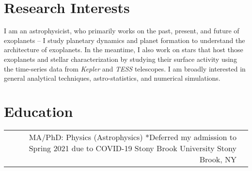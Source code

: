 \documentclass[10pt]{article} %
\begin{document}
\begin{paracol}{1}


\section{Research Interests}
I am an astrophysicist, who primarily works on the past, present, and future of exoplanets -- I study planetary dynamics and planet formation to understand the architecture of exoplanets. 
In the meantime, I also work on stars that host those exoplanets and stellar characterization by studying
their surface activity using the time-series data from \textit{Kepler} and \textit{TESS} telescopes. 
I am broadly interested in general analytical techniques, astro-statistics, and numerical simulations. 


\section{Education} 





\begin{supertabular}{rl} %

	
	
	
	{MA/PhD:} %
	{Physics (Astrophysics)} %
	{*Deferred my admission to Spring 2021 due to COVID-19} %
	{Stony Brook University} %
	{Stony Brook, NY}
	

\end{supertabular}
\end{paracol}
\end{document}
